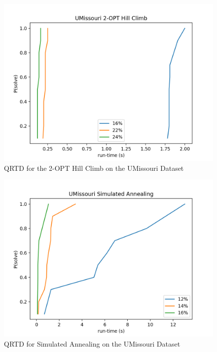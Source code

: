 \documentclass[format=sigconf]{acmart}
\begin{document}
\begin{figure}[htbp]
    \centerline{\includegraphics[scale=.5]{graphs/UMissouri_LS1_QRTD.png}}
    \caption{QRTD for the 2-OPT Hill Climb on the UMissouri Dataset}
    \label{fig:3}
\end{figure}

\begin{figure}[htbp]
    \centerline{\includegraphics[scale=.5]{graphs/UMissouri_LS2_QRTD.png}}
    \caption{QRTD for Simulated Annealing on the UMissouri Dataset}
    \label{fig:4}
\end{figure}
\end{document}

